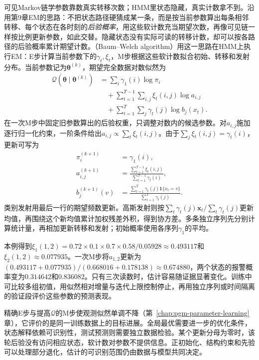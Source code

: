 可见Markov链学参数靠数真实转移次数；HMM里状态隐藏，真实计数拿不到。沿用第9章EM的思路：不把状态路径硬猜成某一条，而是按当前参数算出每条相邻转移、每个状态在各时刻的\emph{后验概率}，用这些软计数充当期望次数，再像可见链一样按比例更新参数，如此交替。隐藏状态没有实际可读的转移计数，却可以按各路径的后验概率累计期望计数。（Baum--Welch algorithm）用这一思路在HMM上执行EM：E步计算当前参数下的$\gamma_t,\xi_t$，M步根据这些软计数拟合初始、转移和发射分布。当前参数记为$\bm{\theta}^{(k)}$，期望完全数据对数似然为
\begin{equation}
  \begin{aligned}
    \mathcal{Q}(\bm{\theta}\mid\bm{\theta}^{(k)})
      &=\sum_i\gamma_1(i)\log\pi_i\\
      &\quad{}+\sum_{t=1}^{T-1}\sum_{i,j}
        \xi_t(i,j)\log a_{i,j}\\
      &\quad{}+\sum_{t=1}^{T}\sum_j
        \gamma_t(j)\log b_j(x_t).
  \end{aligned}
  \label{eq:pgm-dynamic-hmm-em-objective}
\end{equation}
在一次M步中固定旧参数算出的后验权重，只调整对数内的候选参数。对$a_{i,j}$施加逐行归一化约束，一阶条件给出$a_{i,j}\propto\sum_t\xi_t(i,j)$。由于$\sum_j\xi_t(i,j)=\gamma_t(i)$，更新可写为
\begin{equation}
  \begin{aligned}
    \pi_i^{(k+1)}&=\gamma_1(i),\\
    a_{i,j}^{(k+1)}
      &=\frac{\sum_{t=1}^{T-1}\xi_t(i,j)}
        {\sum_{t=1}^{T-1}\gamma_t(i)},\\
    b_j^{(k+1)}(v)
      &=\frac{\sum_{t=1}^{T}
        \gamma_t(j)\mathbf{1}\{x_t=v\}}
        {\sum_{t=1}^{T}\gamma_t(j)}.
  \end{aligned}
  \label{eq:pgm-dynamic-baum-welch}
\end{equation}
类别发射用最后一行的期望频数更新。高斯发射则按$\sum_t\gamma_t(j)\bm{x}_t/\sum_t\gamma_t(j)$更新均值，再围绕这个新均值累计加权残差外积，得到协方差。多条独立序列先分别计算统计量，再相加更新转移和发射；初始概率使用各序列$\gamma_1$的平均。

本例得到$\xi_1(1,2)=0.72\times0.1\times0.7\times0.58/0.05928\approx0.493117$和$\xi_2(1,2)\approx0.077935$。一次M步将$a_{1,2}$更新为$(0.493117+0.077935)/(0.668016+0.178138)\approx0.674880$，两个状态的报警概率变为$0.314642$和$0.836082$。只有三次读数时，估计容易随证据显著变化。训练中可比较多组初值，用似然相对增量与迭代上限控制停止，再用独立序列或时间隔离的验证段评价这些参数的预测表现。

精确E步与提高$\mathcal Q$的M步使观测似然单调不降（第~\ref{chap:pgm-parameter-learning}章），它评价的是同一训练数据上的目标进展。全局最优需要进一步的优化条件，状态解释依赖可识别性，测试预测则需要独立数据检验。某个更新分母为零时，该轮后验没有访问相应状态，软计数对参数不提供信息。正初始化、结构约束和先验可以处理部分退化，估计的可识别范围仍由数据与模型共同决定。

